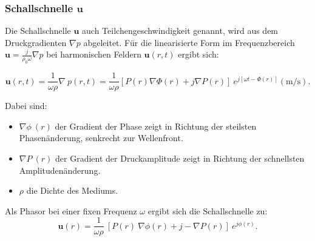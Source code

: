 \subsubsection{Schallschnelle $\mathbf{u}$}
 
Die Schallschnelle $\mathbf{u}$ auch Teilchengeschwindigkeit genannt, wird aus dem Druckgradienten $\nabla p$ abgeleitet. Für die linearisierte Form im Frequenzbereich $\mathbf{u} = \frac{j}{\rho_0 \omega} \nabla p$ bei harmonischen Feldern $\mathbf{u}(r,t)$ ergibt sich:
 
\begin{equation}
\mathbf{u}(r,t) = \frac{1}{\omega \rho} \nabla \: p(r,t) = \frac{1}{\omega \rho} [ P(r) \nabla \Phi(r) + j\nabla P(r) ] \: e^{j[\omega t -\Phi(r)]} (\si{\metre / \second}).
\end{equation}
 
\noindent Dabei sind:
\begin{itemize}
\item $\nabla \phi \: (r)$ der Gradient der Phase zeigt in Richtung der steilsten Phasenänderung, senkrecht zur Wellenfront.
\item $\nabla P \:(r)$ der Gradient der Druckamplitude zeigt in Richtung der schnellsten Amplitudenänderung.
\item $\rho$ die Dichte des Mediums.
\end{itemize}
 
\noindent Als Phasor bei einer fixen Frequenz $\omega$ ergibt sich die Schallschnelle zu:
\begin{equation}
\mathbf{u}(r) = \frac{1}{\omega \rho} \: [ P(r) \: \nabla \phi(r) + j - \nabla P(r) ] \: e^{j\phi (r)}.
\label{helmholtz:PhasorSchallschnelle}
\end{equation}
 
 
 
 
